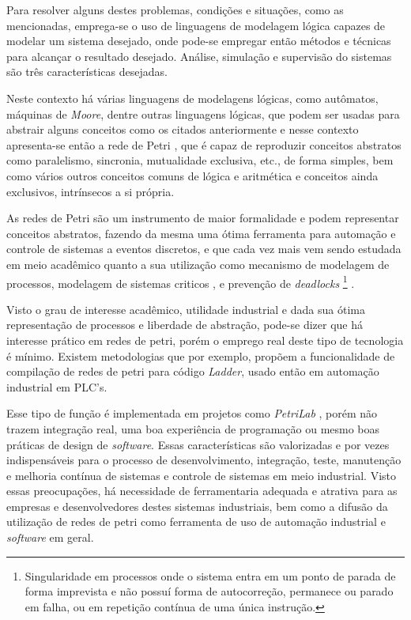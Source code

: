 Para resolver alguns destes problemas, condições e situações, como as mencionadas, emprega-se o uso de linguagens de modelagem lógica capazes de modelar um sistema desejado, onde pode-se empregar então métodos e técnicas para alcançar o resultado desejado. Análise, simulação e supervisão do sistemas são três características desejadas.

Neste contexto há várias linguagens de modelagens lógicas, como autômatos, máquinas de \textit{Moore}, dentre outras linguagens lógicas, que podem ser usadas para abstrair alguns conceitos como os citados anteriormente e nesse contexto apresenta-se então a rede de Petri \cite{scholarpedia2011}, que é capaz de reproduzir conceitos abstratos como paralelismo, sincronia, mutualidade exclusiva, etc., de forma simples, bem como vários outros conceitos comuns de lógica e aritmética e conceitos ainda exclusivos, intrínsecos a si própria. 

As redes de Petri são um instrumento de maior formalidade e podem representar conceitos abstratos, fazendo da mesma uma ótima ferramenta para automação e controle de sistemas a eventos discretos, e que cada vez mais vem sendo estudada em meio acadêmico quanto a sua utilização como mecanismo de modelagem de processos, modelagem de sistemas criticos \cite{1702225} \cite{ghezzi1991unified}, e prevenção de \textit{deadlocks} \footnote{Singularidade em processos onde o sistema entra em um ponto de parada de forma imprevista e não possuí forma de autocorreção, permanece ou parado em falha, ou em repetição contínua de uma única instrução.} \cite{kaid2015applications}.

Visto o grau de interesse acadêmico, utilidade industrial e dada sua ótima representação de processos e liberdade de abstração, pode-se dizer que há interesse prático em redes de petri, porém o emprego real deste tipo de tecnologia é mínimo. Existem metodologias \cite{6621049} que por exemplo, propõem a funcionalidade de compilação de redes de petri para código \textit{Ladder}, usado então em automação industrial em PLC's.

Esse tipo de função é implementada em projetos como \textit{PetriLab} \cite{de2015petrilab}, porém não trazem integração real, uma boa experiência de programação ou mesmo boas práticas de design de \textit{software}. Essas características são valorizadas e por vezes indispensáveis para o processo de desenvolvimento, integração, teste, manutenção e melhoria contínua de sistemas e controle de sistemas em meio industrial. Visto essas preocupações, há necessidade de ferramentaria adequada e atrativa para as empresas e desenvolvedores destes sistemas industriais, bem como a difusão da utilização de redes de petri como ferramenta de uso de automação industrial e \textit{software} em geral.

